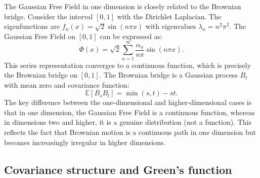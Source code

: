 \documentclass[letterpaper,11pt,oneside,reqno]{book}
\numberwithin{equation}{chapter}  %
\theoremstyle{definition}
\begin{document}
The Gaussian Free Field in one dimension is closely related to the Brownian bridge. Consider the interval $[0,1]$ with the Dirichlet Laplacian. The eigenfunctions are $f_n(x) = \sqrt{2} \sin(n\pi x)$ with eigenvalues $\lambda_n = n^2 \pi^2$. The Gaussian Free Field on $[0,1]$ can be expressed as:
\begin{equation}
	\label{lecture9:eq:Phi_1d}
    \Phi(x) = \sqrt{2} \sum_{n=1}^{\infty} \frac{\alpha_n}{n\pi} \sin(n\pi x).
\end{equation}
This series representation converges to a continuous function, which is precisely the Brownian bridge on $[0,1]$. The Brownian bridge is a Gaussian process $B_t$ with mean zero and covariance function:
\begin{equation}
	\label{lecture9:eq:covariance_1d}
    \mathbb{E}[B_s B_t] = \min(s, t) - st.
\end{equation}
The key difference between the one-dimensional and higher-dimensional cases is that in one dimension, the Gaussian Free Field is a continuous function, whereas in dimensions two and higher, it is a genuine distribution (not a function). This reflects the fact that Brownian motion is a continuous path in one dimension but becomes increasingly irregular in higher dimensions.

\subsection{Covariance structure and Green's function}
\end{document}
